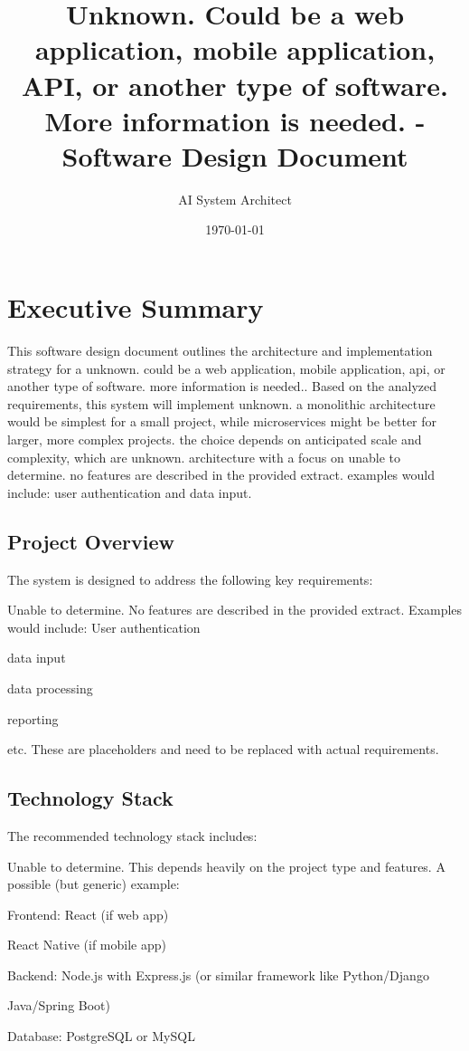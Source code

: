 \documentclass[11pt,a4paper,oneside]{article}
\title{\textbf{Unknown.  Could be a web application, mobile application, API, or another type of software.  More information is needed. - Software Design Document}}
\author{AI System Architect}
\date{\today}
\begin{document}
\maketitle
\thispagestyle{empty}
\newpage

\tableofcontents
\newpage

\section{Executive Summary}

This software design document outlines the architecture and implementation strategy for a unknown.  could be a web application, mobile application, api, or another type of software.  more information is needed.. Based on the analyzed requirements, this system will implement unknown.  a monolithic architecture would be simplest for a small project, while microservices might be better for larger, more complex projects.  the choice depends on anticipated scale and complexity, which are unknown. architecture with a focus on unable to determine.  no features are described in the provided extract.  examples would include: user authentication and data input.

\subsection{Project Overview}

The system is designed to address the following key requirements:
\item Unable to determine. No features are described in the provided extract. Examples would include: User authentication
\item data input
\item data processing
\item reporting
\item etc. These are placeholders and need to be replaced with actual requirements.

\subsection{Technology Stack}

The recommended technology stack includes:
\item Unable to determine. This depends heavily on the project type and features. A possible (but generic) example:
\item Frontend: React (if web app)
\item React Native (if mobile app)
\item Backend: Node.js with Express.js (or similar framework like Python/Django
\item Java/Spring Boot)
\item Database: PostgreSQL or MySQL
\end{document}
